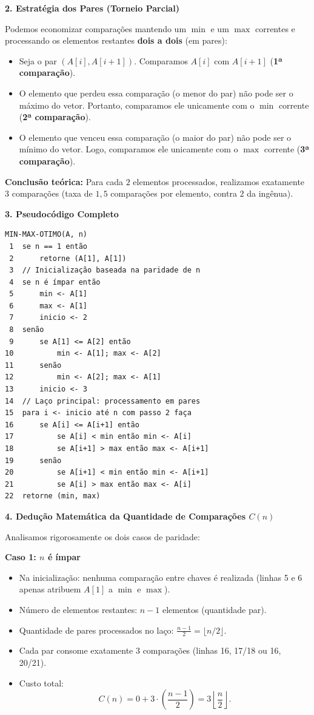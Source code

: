 \documentclass[11pt,a4paper]{article}
\newcommand{\topico}[1]{\par\medskip\textbf{\color{azul}#1}\par}
\newcommand{\destaque}[1]{\textbf{\color{azul}#1}}
\begin{document}
\topico{2. Estratégia dos Pares (Torneio Parcial)}
Podemos economizar comparações mantendo um $\min$ e um $\max$ correntes e processando os elementos restantes \textbf{dois a dois} (em pares):
\begin{itemize}
    \item Seja o par $(A[i], A[i+1])$. Comparamos $A[i]$ com $A[i+1]$ (\destaque{1ª comparação}).
    \item O elemento que perdeu essa comparação (o menor do par) não pode ser o máximo do vetor. Portanto, comparamos ele unicamente com o $\min$ corrente (\destaque{2ª comparação}).
    \item O elemento que venceu essa comparação (o maior do par) não pode ser o mínimo do vetor. Logo, comparamos ele unicamente com o $\max$ corrente (\destaque{3ª comparação}).
\end{itemize}
\textbf{Conclusão teórica:} Para cada $2$ elementos processados, realizamos exatamente $3$ comparações (taxa de $1{,}5$ comparações por elemento, contra $2$ da ingênua).

\topico{3. Pseudocódigo Completo}
\begin{lstlisting}
MIN-MAX-OTIMO(A, n)
 1  se n == 1 então
 2      retorne (A[1], A[1])
 3  // Inicialização baseada na paridade de n
 4  se n é ímpar então
 5      min <- A[1]
 6      max <- A[1]
 7      inicio <- 2
 8  senão
 9      se A[1] <= A[2] então
10          min <- A[1]; max <- A[2]
11      senão
12          min <- A[2]; max <- A[1]
13      inicio <- 3
14  // Laço principal: processamento em pares
15  para i <- inicio até n com passo 2 faça
16      se A[i] <= A[i+1] então
17          se A[i] < min então min <- A[i]
18          se A[i+1] > max então max <- A[i+1]
19      senão
20          se A[i+1] < min então min <- A[i+1]
21          se A[i] > max então max <- A[i]
22  retorne (min, max)
\end{lstlisting}

\topico{4. Dedução Matemática da Quantidade de Comparações $C(n)$}
Analisamos rigorosamente os dois casos de paridade:

\textbf{Caso 1: $n$ é ímpar}
\begin{itemize}
    \item Na inicialização: nenhuma comparação entre chaves é realizada (linhas 5 e 6 apenas atribuem $A[1]$ a $\min$ e $\max$).
    \item Número de elementos restantes: $n - 1$ elementos (quantidade par).
    \item Quantidade de pares processados no laço: $\frac{n - 1}{2} = \lfloor n/2 \rfloor$.
    \item Cada par consome exatamente 3 comparações (linhas 16, 17/18 ou 16, 20/21).
    \item Custo total:
    \[
    C(n) = 0 + 3 \cdot \left(\frac{n - 1}{2}\right) = 3 \left\lfloor \frac{n}{2} \right\rfloor.
    \]
\end{itemize}
\end{document}
